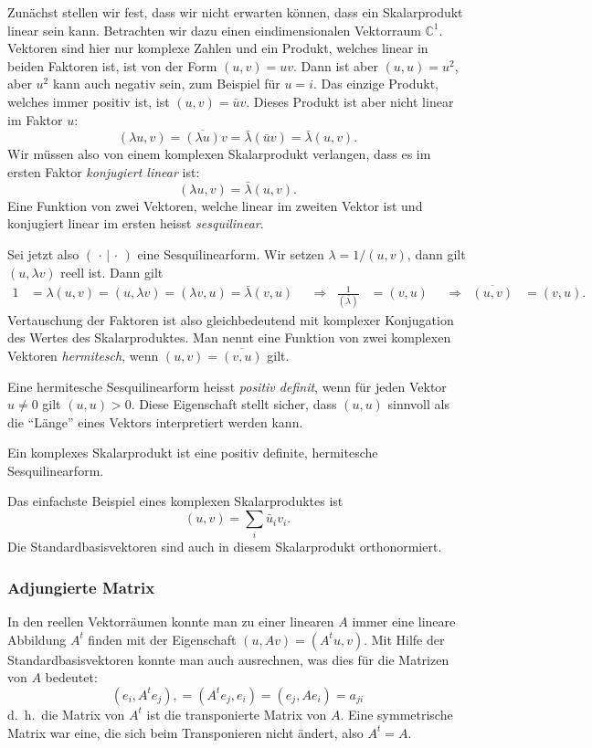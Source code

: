 Zunächst stellen wir fest, dass wir nicht erwarten können, dass
ein Skalarprodukt linear sein kann.
Betrachten wir dazu einen eindimensionalen Vektorraum $\mathbb C^1$.
Vektoren sind hier nur komplexe Zahlen und ein Produkt, welches
linear in beiden Faktoren ist, ist von der Form $(u,v)=uv$. Dann ist
aber $(u,u)=u^2$, aber $u^2$ kann auch negativ sein, zum Beispiel für $u=i$.
Das einzige Produkt, welches immer positiv ist, ist $(u,v)=\bar uv$.
Dieses Produkt ist aber nicht linear im Faktor $u$:
\[
(\lambda u,v)=\overline{(\lambda u)}v=\bar\lambda (\bar uv)=\bar\lambda (u,v).
\]
Wir müssen also von einem komplexen Skalarprodukt verlangen, dass es
im ersten Faktor {\em konjugiert linear} ist:
\[
(\lambda u,v)=\bar\lambda(u,v).
\]
Eine Funktion von zwei Vektoren, welche linear im zweiten Vektor ist
und konjugiert linear im ersten heisst {\em sesquilinear}.
%
%

Sei jetzt also $(\,\cdot\,|\,\cdot\,)$ eine Sesquilinearform.
Wir setzen $\lambda = 1/(u,v)$, dann gilt
$(u,\lambda v)$ reell ist. Dann gilt
\begin{align*}
1&=\lambda (u,v)=(u,\lambda v)=(\lambda v,u)=\bar\lambda(v,u)
&
&\Rightarrow&
\frac1{(\bar\lambda)}&=(v,u)
&
&\Rightarrow&
\overline{(u,v)}&=(v,u).
\end{align*}
Vertauschung der Faktoren ist also gleichbedeutend mit komplexer Konjugation
des Wertes des Skalarproduktes. Man nennt eine Funktion von zwei komplexen
Vektoren {\em hermitesch}, wenn $(u,v)=\overline{(v,u)}$ gilt.

Eine hermitesche Sesquilinearform heisst {\em positiv definit}, wenn
für jeden Vektor $u\ne 0$ gilt $(u,u)>0$. Diese Eigenschaft stellt
sicher, dass $(u,u)$ sinnvoll als die ``Länge'' eines Vektors interpretiert
werden kann.

\begin{definition}
Ein komplexes Skalarprodukt ist eine positiv definite,
hermitesche Sesquilinearform.
\end{definition}

Das einfachste Beispiel eines komplexen Skalarproduktes ist
\[
(u,v)=\sum_i \bar u_iv_i.
\]
Die Standardbasisvektoren sind auch in diesem Skalarprodukt
orthonormiert.

%
%
\subsubsection{Adjungierte Matrix}
In den reellen Vektorräumen konnte man zu einer linearen $A$ immer
eine lineare Abbildung $A^t$ finden mit der Eigenschaft
$(u,Av)=(A^tu,v)$. Mit Hilfe der Standardbasisvektoren konnte
man auch ausrechnen, was dies für die Matrizen von $A$ bedeutet:
\[
(e_i,A^te_j),
=
(A^te_j, e_i)
=
(e_j,Ae_i)=a_{ji}
\]
d.~h.~die Matrix von $A^t$ ist die transponierte Matrix von $A$.
Eine symmetrische Matrix war eine, die sich beim Transponieren nicht
ändert, also $A^t=A$.

